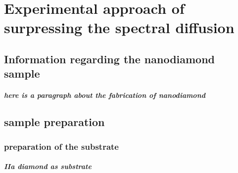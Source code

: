 \chapter[Experimental approach of surpressing the spectral diffusion]{Experimental approach of surpressing the spectral diffusion} %

\label{Chapter2} %

\section{Information regarding the nanodiamond sample}

\paragraph{here is a paragraph about the fabrication of nanodiamond}

\section[sample preparation]{sample preparation}
\subsection{preparation of the substrate}
\paragraph{IIa diamond as substrate}


